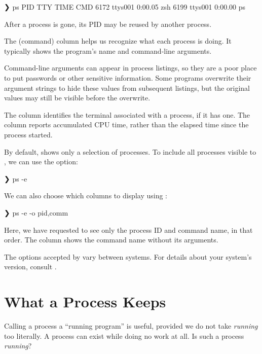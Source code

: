 \documentclass[11pt]{article}
\begin{document}
\begin{terminal}[unbreakable]
❯ ps
  PID TTY           TIME CMD
 6172 ttys001    0:00.05 zsh
 6199 ttys001    0:00.00 ps
\end{terminal}

After a process is gone, its PID may be reused by another process.

The  (command) column helps us recognize what each process is doing.
It typically shows the program's name and command-line arguments.

\begin{aside}
Command-line arguments can appear in process listings, so they are a poor place to put passwords or other sensitive information.
Some programs overwrite their argument strings to hide these values from subsequent listings, but the original values may still be visible before the overwrite.
\end{aside}

The  column identifies the terminal associated with a process, if it has one.
The  column reports accumulated CPU time, rather than the elapsed time since the process started.

By default,  shows only a selection of processes.
To include all processes visible to , we can use the  option:

\begin{terminal}
❯ ps -e
\end{terminal}

We can also choose which columns to display using :

\begin{terminal}[unbreakable]
❯ ps -e -o pid,comm
\end{terminal}

Here, we have requested to see only the process ID and command name, in that order.
The  column shows the command name without its arguments.

The options accepted by  vary between systems.
For details about your system's version, consult .

\section{What a Process Keeps}

Calling a process a ``running program'' is useful, provided we do not take \emph{running} too literally.
A process can exist while doing no work at all.
Is such a process \emph{running}?
\end{document}
